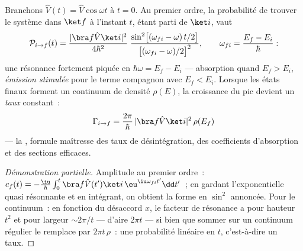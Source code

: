 \begin{theorem}\label{thm:b3:perturbation-theory:golden}
Branchons $\hat V(t) = \hat V\cos\omega t$ à $t = 0$. Au premier
ordre, la probabilité de trouver le système dans $\ket f$ à l'instant
$t$, étant parti de $\ket i$, vaut
\[
\mathcal P_{i\to f}(t) = \frac{|\bra f\hat V\ket i|^2}{4\hbar^2}\;
\frac{\sin^2\!\big[(\omega_{fi} - \omega)\,t/2\big]}
{\big[(\omega_{fi} - \omega)/2\big]^2} ,
\qquad \omega_{fi} = \frac{E_f - E_i}{\hbar} :
\]
une résonance fortement piquée en $\hbar\omega = E_f - E_i$ ---
absorption quand $E_f > E_i$, \emph{émission stimulée} pour le terme
compagnon avec $E_f < E_i$. Lorsque les états finaux forment un
continuum de densité $\rho(E)$, la croissance du pic devient un
\emph{taux} constant~:
\[
\Gamma_{i\to f} = \frac{2\pi}{\hbar}\,
|\bra f\hat V\ket i|^2\,\rho(E_f)
\]
--- la \emph{}, formule maîtresse des taux de
désintégration, des coefficients d'absorption et des sections
efficaces.
\end{theorem}

\begin{proof}[Démonstration partielle]
Amplitude au premier ordre~: $c_f(t) = -\tfrac{\iu}{\hbar}\int_0^t\bra
f\hat V(t')\ket i\,\eu^{\iu\omega_{fi}t'}\dd t'$~; en gardant
l'exponentielle quasi résonnante et en intégrant, on obtient la forme
en $\sin^2$ annoncée. Pour le continuum~: en fonction du désaccord
$x$, le facteur de résonance a pour hauteur $t^2$ et pour largeur
$\sim 2\pi/t$ --- d'aire $2\pi t$ --- si bien que sommer sur un
continuum régulier le remplace par $2\pi t\,\rho$~: une probabilité
linéaire en $t$, c'est-à-dire un taux.
\end{proof}


